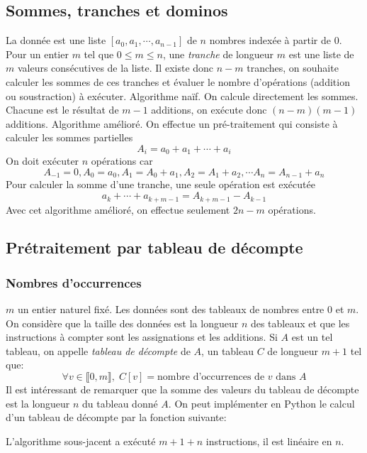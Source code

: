 \subsection{Sommes, tranches et dominos}
La donnée est une liste $[a_0,a_1,\cdots,a_{n-1}]$ de $n$ nombres indexée à partir de $0$. Pour un entier $m$ tel que $0\leq m \leq n$, une \emph{tranche} de longueur $m$ est une liste de $m$ valeurs consécutives de la liste. Il existe donc $n-m$ tranches, on souhaite calculer les sommes de ces tranches et évaluer le nombre d'opérations (addition ou soustraction) à exécuter.\newline
Algorithme naïf. On calcule directement les sommes. Chacune est le résultat de $m-1$ additions, on exécute donc $(n-m)(m-1)$ additions.\newline
Algorithme amélioré. On effectue un pré-traitement qui consiste à calculer les sommes partielles
\begin{displaymath}
  A_i = a_0 + a_1 + \cdots + a_i
\end{displaymath}
On doit exécuter $n$ opérations car 
\begin{displaymath}
A_{-1} = 0, A_0 = a_0, A_1 = A_0 + a_1, A_2 = A_1 + a_2,\cdots A_n = A_{n-1} + a_n
\end{displaymath}
Pour calculer la somme d'une tranche, une seule opération est exécutée
\begin{displaymath}
  a_k+\cdots+a_{k+m-1} = A_{k+m-1} - A_{k-1}
\end{displaymath}
Avec cet algorithme amélioré, on effectue seulement $2n-m$ opérations.

\subsection{Prétraitement par tableau de décompte}
\subsubsection{Nombres d'occurrences}
$m$ un entier naturel fixé. Les données sont des tableaux de nombres entre $0$ et $m$. On considère que la taille des données est la longueur $n$ des tableaux et que les instructions à compter sont les assignations et les additions.\newline
Si $A$ est un tel tableau, on appelle \emph{tableau de décompte} de $A$, un tableau $C$ de longueur $m+1$ tel que: 
\begin{displaymath}
  \forall v\in \llbracket 0, m \rrbracket,\; C[v] = \text{nombre d'occurrences de $v$ dans $A$}
\end{displaymath}
Il est intéressant de remarquer que la somme des valeurs du tableau de décompte est la longueur $n$ du tableau donné $A$.\newline
On peut implémenter en Python le calcul d'un tableau de décompte par la fonction suivante:

L'algorithme sous-jacent a exécuté $m+1+n$ instructions, il est linéaire en $n$.

